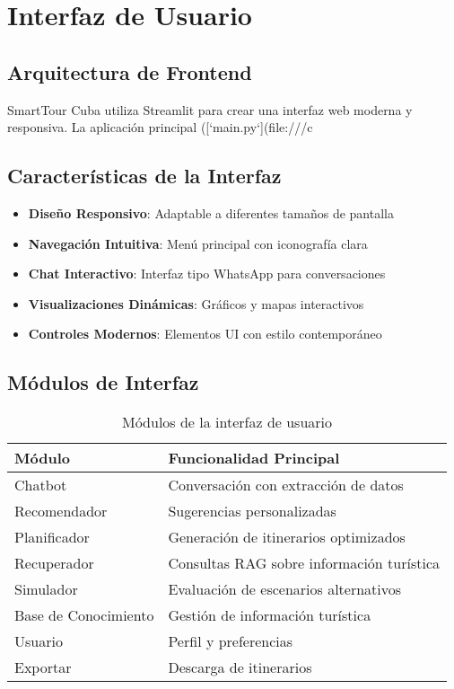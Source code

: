 \documentclass[runningheads]{llncs}
\begin{document}
\section{Interfaz de Usuario}

\subsection{Arquitectura de Frontend}

SmartTour Cuba utiliza Streamlit para crear una interfaz web moderna y responsiva. La aplicación principal ([`main.py`](file:///c%

\subsection{Características de la Interfaz}

\begin{itemize}
\item \textbf{Diseño Responsivo}: Adaptable a diferentes tamaños de pantalla
\item \textbf{Navegación Intuitiva}: Menú principal con iconografía clara
\item \textbf{Chat Interactivo}: Interfaz tipo WhatsApp para conversaciones
\item \textbf{Visualizaciones Dinámicas}: Gráficos y mapas interactivos
\item \textbf{Controles Modernos}: Elementos UI con estilo contemporáneo
\end{itemize}

\subsection{Módulos de Interfaz}

\begin{table}[H]
\centering
\begin{tabular}{ll}
\toprule
\textbf{Módulo} & \textbf{Funcionalidad Principal} \\
\midrule
Chatbot & Conversación con extracción de datos \\
Recomendador & Sugerencias personalizadas \\
Planificador & Generación de itinerarios optimizados \\
Recuperador & Consultas RAG sobre información turística \\
Simulador & Evaluación de escenarios alternativos \\
Base de Conocimiento & Gestión de información turística \\
Usuario & Perfil y preferencias \\
Exportar & Descarga de itinerarios \\
\bottomrule
\end{tabular}
\caption{Módulos de la interfaz de usuario}
\end{table}
\end{document}
